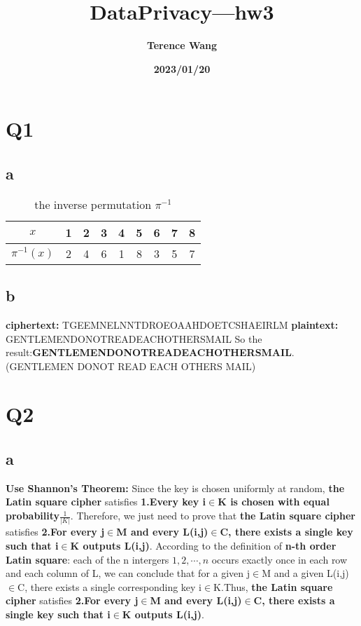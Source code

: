 \documentclass[12pt]{article}
\title{\textbf{DataPrivacy—hw3}}
\author{\textbf{Terence Wang}}%
\date{\textbf{2023/01/20}}%
\begin{document}
\maketitle
\tableofcontents
\newpage

\section{Q1}
\subsection{a}
\begin{table}[h]
    \centering
    \caption{the inverse permutation $\pi^{-1}$}\label{tab:tab1}
    \begin{tabular}{|c|c|c|c|c|c|c|c|c|}
        \hline
        $x$           & 1 & 2 & 3 & 4 & 5 & 6 & 7 & 8 \\\hline
        $\pi^{-1}(x)$ & 2 & 4 & 6 & 1 & 8 & 3 & 5 & 7 \\
        \hline
    \end{tabular}
\end{table}

\subsection{b}
\textbf{ciphertext:}
\newline
TGEEMNEL\quad NNTDROEO\quad AAHDOETC\quad SHAEIRLM
\newline
\textbf{plaintext:}
\newline
GENTLEME\quad NDONOTRE\quad ADEACHOT\quad HERSMAIL
\newline
\newline
So the result:\textbf{GENTLEMENDONOTREADEACHOTHERSMAIL}. (GENTLEMEN DONOT READ EACH OTHERS MAIL)

\section{Q2}
\subsection{a}
\textbf{Use Shannon's Theorem:}
\newline
\newline
Since the key is chosen uniformly at random, \textbf{the Latin square cipher} satisfies \textbf{1.Every key i$\in$K is chosen with equal probability$\frac{1}{|K|}$}.
\newline
\newline
Therefore, we just need to prove that \textbf{the Latin square cipher} satisfies \textbf{2.For every j$\in$M and every L(i,j)$\in$C, there exists a single key such that i$\in$K outputs L(i,j)}.
\newline
\newline
According to the definition of \textbf{n-th order Latin square}: each of the n intergers $1,2,\cdots,n$ occurs exactly once in each row and each column of L, we can conclude that for a given j$\in$M and a given L(i,j)$\in$C, there exists a single corresponding key i$\in$K.Thus, \textbf{the Latin square cipher} satisfies \textbf{2.For every j$\in$M and every L(i,j)$\in$C, there exists a single key such that i$\in$K outputs L(i,j)}.
\end{document}
